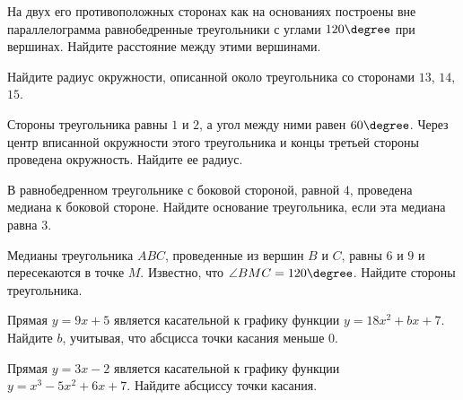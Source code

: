 \begin{class}[number=5]
\begin{listofex}
		На двух его противоположных сторонах как на основаниях построены
		вне параллелограмма равнобедренные треугольники с углами \( 120\degree \)
		при вершинах. Найдите расстояние между этими вершинами.
		\item Найдите радиус окружности, описанной около треугольника со сторонами \( 13 \), \( 14 \), \( 15 \).
		\item Стороны треугольника равны \( 1 \) и \( 2 \), а угол между
		ними равен \( 60\degree \). Через центр вписанной окружности этого треугольника и концы третьей стороны проведена окружность.
		Найдите ее радиус.
		\item В равнобедренном треугольнике с боковой стороной,
		равной \( 4 \), проведена медиана к боковой стороне. Найдите основание треугольника, если эта медиана равна \( 3 \).
		\item Медианы треугольника \( ABC \), проведенные из вершин \( B \) и \( C \), равны \( 6 \) и \( 9 \) и пересекаются в точке \( M \). Известно,
		что \( \angle BMC = 120\degree \). Найдите стороны треугольника.
	\end{listofex}
\end{class}


\begin{homework}[number=3]
	\begin{listofex}
		\item Прямая \( y=9x+5 \) является касательной к графику функции \( y=18x^2+bx+7 \). Найдите \( b \), учитывая, что абсцисса точки касания меньше \( 0 \).
		\item Прямая \( y=3x-2 \) является касательной к графику функции \( y=x^3-5x^2+6x+7 \). Найдите абсциссу точки касания.
	\end{listofex}
\end{homework}

%	

%	
